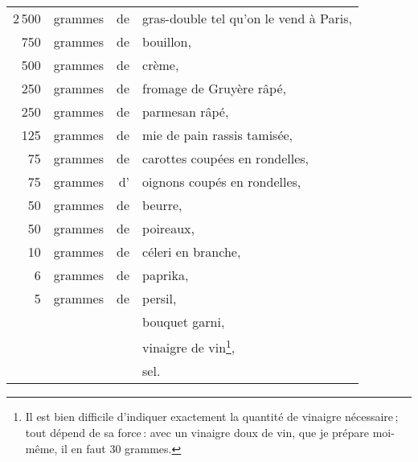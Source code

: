 \footnotesize
\begin{longtable}{rrrp{18em}}
  2 500 & grammes & de & gras-double tel qu'on le vend à Paris,                                           \\
    750 & grammes & de & bouillon,                                                                        \\
    500 & grammes & de & crème,                                                                           \\
    250 & grammes & de & fromage de Gruyère râpé,                                                         \\
    250 & grammes & de & parmesan râpé,                                                                   \\
    125 & grammes & de & mie de pain rassis tamisée,                                                      \\
     75 & grammes & de & carottes coupées en rondelles,                                                   \\
     75 & grammes & d' & oignons coupés en rondelles,                                                     \\
     50 & grammes & de & beurre,                                                                          \\
     50 & grammes & de & poireaux,                                                                        \\
     10 & grammes & de & céleri en branche,                                                               \\
      6 & grammes & de & paprika,                                                                         \\
      5 & grammes & de & persil,                                                                          \\
        &         &    & bouquet garni,                                                                   \\
        &         &    & vinaigre de vin\footnote{Il est bien difficile d'indiquer
                                                  exactement la quantité de vinaigre
                                                  nécessaire ; tout dépend de sa force :
                                                  avec un vinaigre doux de vin, que je
                                                  prépare moi-même, il en faut 30 grammes.},              \\
        &         &    & sel.                                                                             \\
\end{longtable}
\normalsize

